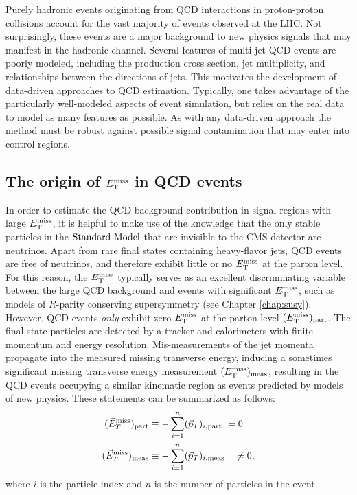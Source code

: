 
Purely hadronic events originating from QCD interactions in proton-proton collisions account for the vast majority of events observed at the LHC. Not surprisingly, these events are a major background to new physics signals that may manifest in the hadronic channel. Several features of multi-jet QCD events are poorly modeled, including the production cross section, jet multiplicity, and relationships between the directions of jets. This motivates the development of data-driven approaches to QCD estimation. Typically, one takes advantage of the particularly well-modeled aspects of event simulation, but relies on the real data to model as many features as possible. As with any data-driven approach the method must be robust against possible signal contamination that may enter into control regions. 

\subsection{The origin of $E_{\text{T}}^{\rm miss}$ in QCD events}
In order to estimate the QCD background contribution in signal regions with large $E_{\text{T}}^{\rm miss}$, it is helpful to make use of the knowledge that the only stable particles in the $\text{Standard\ Model}$ that are invisible to the CMS detector are neutrinos. Apart from rare final states containing heavy-flavor jets,  QCD events are free of neutrinos, and therefore exhibit little or no $E_{\text{T}}^{\rm miss}$ at the parton level.  For this reason, the $E_{\text{T}}^{\rm miss}$ typically serves as an excellent discriminating variable between the large QCD background and events with significant $E_{\text{T}}^{\rm miss}$, such as models of $R$-parity conserving supersymmetry (see Chapter \ref{chap:susy}). However, QCD events {\it only} exhibit zero $E_{\text{T}}^{\rm miss}$ at the parton level $(E_{\text{T}}^{\rm miss})_{\rm part}$. The final-state particles are detected by a tracker and calorimeters with finite momentum and energy resolution. Mis-measurements of the jet momenta propagate into the measured missing transverse energy, inducing a sometimes significant missing transverse energy measurement $(E_{\text{T}}^{\rm miss})_{\rm meas}$, resulting in the QCD events occupying a similar kinematic region as events predicted by models of new physics.  These statements can be summarized as follows:
\begin{align}
(\vec{E}_{ T}^{\rm miss})_{\rm part} &\equiv -\sum_{i=1}^{n}(\vec{p}_{T})_{i,\rm part\ }=0\\
(\vec{E}_{ T}^{\rm miss})_{\rm meas} &\equiv -\sum_{i=1}^{n}(\vec{p}_{T})_{i,\rm meas\ \ \ }\neq 0,
\label{eq:metTrue}
\end{align}
where $i$ is the particle index and $n$ is the number of particles in the event.

